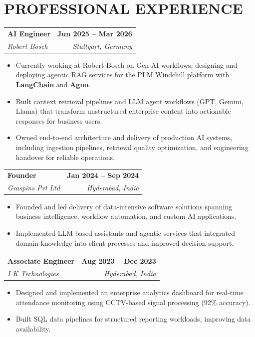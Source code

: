 \documentclass[a4paper,11pt]{article}
\makeatletter
\newcommand{\entryheader}[4]{%
  \begin{tabularx}{\textwidth}{@{}>{\RaggedRight\arraybackslash}X r@{}}
    \textbf{#1} & \textbf{#2} \\
    \textit{#3} & \textit{#4} \\
  \end{tabularx}%
}
\newenvironment{entrybullets}{%
  \begin{minipage}[t]{0.77\textwidth}
    \begin{itemize}[leftmargin=*,label=\textbullet,align=left]
}{%
    \end{itemize}
  \end{minipage}
}
\makeatother
\begin{document}
\section*{PROFESSIONAL EXPERIENCE}
\entryheader{AI Engineer}{Jun 2025 -- Mar 2026}{Robert Bosch}{Stuttgart, Germany}
\begin{entrybullets}
  \item Currently working at Robert Bosch on Gen AI workflows, designing and deploying agentic RAG services for the PLM Windchill platform with \textbf{LangChain} and \textbf{Agno}.
  \item Built context retrieval pipelines and LLM agent workflows (GPT, Gemini, Llama) that transform unstructured enterprise content into actionable responses for business users.
  \item Owned end-to-end architecture and delivery of production AI systems, including ingestion pipelines, retrieval quality optimization, and engineering handover for reliable operations.
\end{entrybullets}

\vspace{0.25cm}
\entryheader{Founder}{Jan 2024 -- Sep 2024}{Graspins Pvt Ltd}{Hyderabad, India}
\begin{entrybullets}
  \item Founded and led delivery of data-intensive software solutions spanning business intelligence, workflow automation, and custom AI applications.
  \item Implemented LLM-based assistants and agentic services that integrated domain knowledge into client processes and improved decision support.
\end{entrybullets}

\vspace{0.25cm}
\entryheader{Associate Engineer}{Aug 2023 -- Dec 2023}{I K Technologies}{Hyderabad, India}
\begin{entrybullets}
  \item Designed and implemented an enterprise analytics dashboard for real-time attendance monitoring using CCTV-based signal processing (92\% accuracy).
  \item Built SQL data pipelines for structured reporting workloads, improving data availability.
\end{entrybullets}

\end{document}
